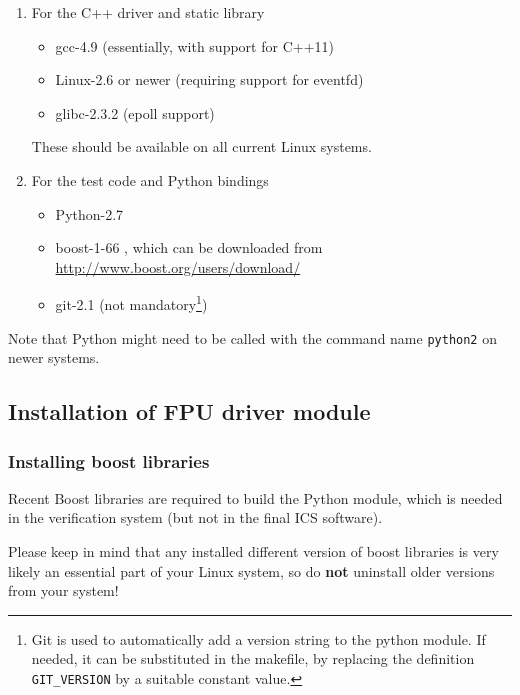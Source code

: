 \documentclass{scrartcl}[12pt,a4paper]
\begin{document}
\begin{enumerate}
  \item For the C++ driver and static library

    
\begin{itemize}
\item gcc-4.9 (essentially, with support for C++11)
\item Linux-2.6 or newer (requiring support for eventfd)
\item glibc-2.3.2 (epoll support)
\end{itemize}

These should be available on all current Linux systems.

\item For the test code and Python bindings

\begin{itemize}
\item Python-2.7
\item boost-1-66 , which can be downloaded from \url{http://www.boost.org/users/download/}
\item git-2.1 (not mandatory\footnote{Git is used to automatically add a version
  string to the python module. If needed, it can be substituted in the
  makefile, by replacing the definition \texttt{GIT\_VERSION} by a
  suitable constant value.})
\end{itemize}
\end{enumerate}


Note that Python might need to be called with the command name
\texttt{python2} on newer systems.

\subsection{Installation of FPU driver module}

\subsubsection{Installing boost libraries}

Recent Boost libraries are required to build the Python module, which
is needed in the verification system (but not in the final ICS
software).

Please keep in mind that any installed different version of boost
libraries is very likely an essential part of your Linux system, so do
\textbf{not} uninstall older versions from your system!
\end{document}
